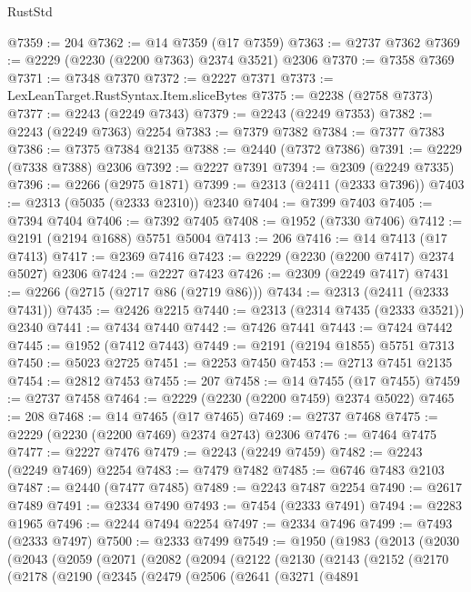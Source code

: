 \begin{lexlean}{RustStd}
\begin{coremodule}
@7359 := 204
@7362 := @14 @7359 (@17 @7359)
@7363 := @2737 @7362
@7369 := @2229 (@2230 (@2200 @7363) @2374 @3521) @2306
@7370 := @7358 @7369
@7371 := @7348 @7370
@7372 := @2227 @7371
@7373 := LexLeanTarget.RustSyntax.Item.sliceBytes
@7375 := @2238 (@2758 @7373)
@7377 := @2243 (@2249 @7343)
@7379 := @2243 (@2249 @7353)
@7382 := @2243 (@2249 @7363) @2254
@7383 := @7379 @7382
@7384 := @7377 @7383
@7386 := @7375 @7384 @2135
@7388 := @2440 (@7372 @7386)
@7391 := @2229 (@7338 @7388) @2306
@7392 := @2227 @7391
@7394 := @2309 (@2249 @7335)
@7396 := @2266 (@2975 @1871)
@7399 := @2313 (@2411 (@2333 @7396))
@7403 := @2313 (@5035 (@2333 @2310)) @2340
@7404 := @7399 @7403
@7405 := @7394 @7404
@7406 := @7392 @7405
@7408 := @1952 (@7330 @7406)
@7412 := @2191 (@2194 @1688) @5751 @5004
@7413 := 206
@7416 := @14 @7413 (@17 @7413)
@7417 := @2369 @7416
@7423 := @2229 (@2230 (@2200 @7417) @2374 @5027) @2306
@7424 := @2227 @7423
@7426 := @2309 (@2249 @7417)
@7431 := @2266 (@2715 (@2717 @86 (@2719 @86)))
@7434 := @2313 (@2411 (@2333 @7431))
@7435 := @2426 @2215
@7440 := @2313 (@2314 @7435 (@2333 @3521)) @2340
@7441 := @7434 @7440
@7442 := @7426 @7441
@7443 := @7424 @7442
@7445 := @1952 (@7412 @7443)
@7449 := @2191 (@2194 @1855) @5751 @7313
@7450 := @5023 @2725
@7451 := @2253 @7450
@7453 := @2713 @7451 @2135
@7454 := @2812 @7453
@7455 := 207
@7458 := @14 @7455 (@17 @7455)
@7459 := @2737 @7458
@7464 := @2229 (@2230 (@2200 @7459) @2374 @5022)
@7465 := 208
@7468 := @14 @7465 (@17 @7465)
@7469 := @2737 @7468
@7475 := @2229 (@2230 (@2200 @7469) @2374 @2743) @2306
@7476 := @7464 @7475
@7477 := @2227 @7476
@7479 := @2243 (@2249 @7459)
@7482 := @2243 (@2249 @7469) @2254
@7483 := @7479 @7482
@7485 := @6746 @7483 @2103
@7487 := @2440 (@7477 @7485)
@7489 := @2243 @7487 @2254
@7490 := @2617 @7489
@7491 := @2334 @7490
@7493 := @7454 (@2333 @7491)
@7494 := @2283 @1965
@7496 := @2244 @7494 @2254
@7497 := @2334 @7496
@7499 := @7493 (@2333 @7497)
@7500 := @2333 @7499
@7549 := @1950
    (@1983
      (@2013
        (@2030
          (@2043
            (@2059
              (@2071
                (@2082
                  (@2094
                    (@2122
                      (@2130
                        (@2143
                          (@2152
                            (@2170
                              (@2178
                                (@2190
                                  (@2345
                                    (@2479
                                      (@2506
                                        (@2641
                                          (@3271
                                            (@4891

\end{coremodule}
\end{lexlean}
